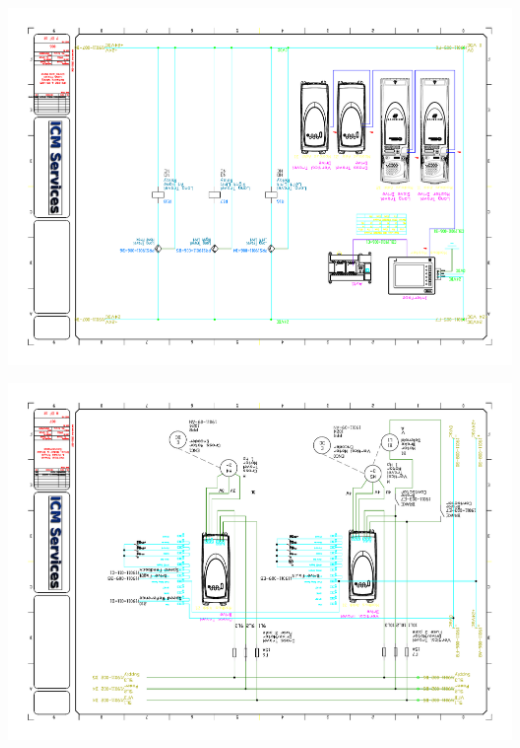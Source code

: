 \begin{center}
	\includegraphics[width=7.5in,angle=90]{../DRAWINGS/19011-006.pdf}
	\label{schem:006} %
\end{center}
\begin{center}
	\includegraphics[width=7.5in,angle=90]{../DRAWINGS/19011-007.pdf}
	\label{schem:007} %
\end{center}
